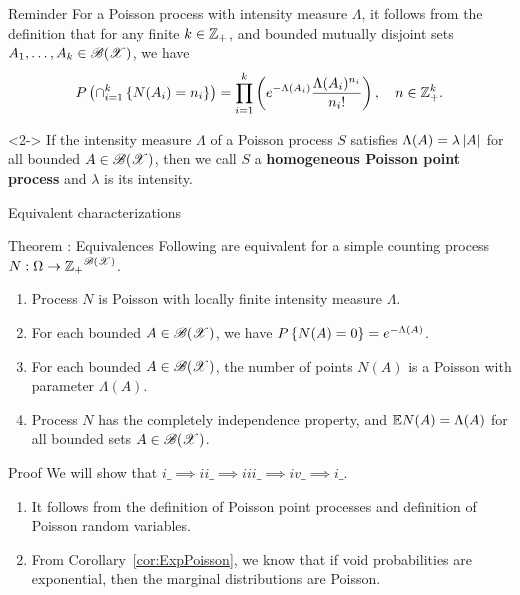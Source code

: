 \documentclass[12pt,aspectratio=169]{beamer}
\begin{document}
\begin{frame}
\begin{block}{Reminder}
For a Poisson process with intensity measure $\Lambda$, 
it follows from the definition that for any finite $k \in \mathbb{Z}_+$, 
and bounded mutually disjoint sets $A_1, \dots, A_k \in \mathscr{B}(\mathscr{X})$, we have  
\begin{align*}
P\left(\cap_{i=1}^k\left\{N(A_i) = n_i\right\}\right) = \prod_{i=1}^k\left(e^{-\Lambda(A_i)}\frac{\Lambda(A_i)^{n_i}}{n_i!}\right),\quad n \in \mathbb{Z}_+^k.
\end{align*}
\end{block} 
\begin{Definition}<2->
If the intensity measure $\Lambda$ of a Poisson process $S$ satisfies $\Lambda(A) = \lambda\left\lvert A\right\rvert$ for all bounded $A \in \mathscr{B}(\mathscr{X})$, then we call $S$ a \textbf{homogeneous Poisson point process} and $\lambda$ is its intensity.  
\end{Definition} 
\end{frame}

\begin{frame}{Equivalent characterizations}
\begin{block}{Theorem : Equivalences} 
\label{thm:equiv}
Following are equivalent for a simple counting process $N: \Omega \to {\mathbb{Z}_+}^{\mathscr{B}(\mathscr{X})}$. 
\begin{enumerate}[i\_]
\item Process $N$ is Poisson with locally finite intensity measure $\Lambda$. 
\item For each bounded $A \in \mathscr{B}(\mathscr{X})$, we have $P\left\{N(A) = 0\right\} = e^{-\Lambda(A)}$. 
\item %
For each bounded $A \in \mathscr{B}(\mathscr{X})$,  the number of points $N(A)$ is a Poisson with parameter $\Lambda(A)$. 
\item Process $N$ has the completely independence property, and $\mathbb{E} N(A) = \Lambda(A)$ for all bounded sets $A \in \mathscr{B}(\mathscr{X})$. 
\end{enumerate}
\end{block}
\end{frame}


\begin{frame}
\begin{block}{Proof}
We will show that $i\_ \implies ii\_ \implies iii\_ \implies iv\_ \implies i\_$. 
\begin{enumerate}
	\item[$i \implies ii\_$] It follows from the definition of Poisson point processes and definition of Poisson random variables.  
	\item[$ii \implies iii\_$] 
	From Corollary~\ref{cor:ExpPoisson}, we know that if void probabilities are exponential, then the marginal distributions are Poisson. 
\end{enumerate}
\end{block}
\end{frame}
\end{document}
